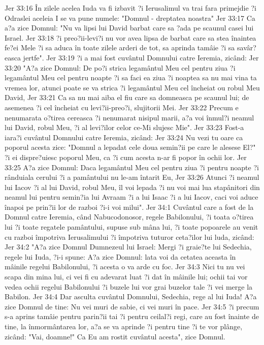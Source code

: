 Jer 33:16  În zilele acelea Iuda va fi izbavit ?i Ierusalimul va trai fara primejdie ?i Odraslei aceleia I se va pune numele: "Domnul - dreptatea noastra"
Jer 33:17  Ca a?a zice Domnul: "Nu va lipsi lui David barbat care sa ?ada pe scaunul casei lui Israel.
Jer 33:18  ?i preo?ii-levi?i nu vor avea lipsa de barbat care sa stea înaintea fe?ei Mele ?i sa aduca în toate zilele arderi de tot, sa aprinda tamâie ?i sa savâr?easca jertfe".
Jer 33:19  ?i a mai fost cuvântul Domnului catre Ieremia, zicând:
Jer 33:20  "A?a zice Domnul: De po?i strica legamântul Meu cel pentru ziua ?i legamântul Meu cel pentru noapte ?i sa faci ea ziua ?i noaptea sa nu mai vina ta vremea lor, atunci poate se va strica ?i legamântul Meu cel încheiat ou robul Meu David,
Jer 33:21  Ca sa nu mai aiba el fiu care sa domneasca pe scaunul lui; de asemenea ?i cel încheiat cu levi?ii-preo?i, slujitorii Mei.
Jer 33:22  Precum e nenumarata o?tirea cereasca ?i nenumarat nisipul marii, a?a voi înmul?i neamul lui David, robul Meu, ?i al levi?ilor celor ce-Mi slujesc Mie".
Jer 33:23  Fost-a iara?i cuvântul Domnului catre Ieremia, zicând:
Jer 33:24  Nu vezi tu oare ca poporul acesta zice: "Domnul a lepadat cele doua semin?ii pe care le alesese El?" ?i ei dispre?uiesc poporul Meu, ca ?i cum acesta n-ar fi popor în ochii lor.
Jer 33:25  A?a zice Domnul: Daca legamântul Meu cel pentru ziua ?i pentru noapte ?i rânduiala cerului ?i a pamântului nu le-am întarit Eu,
Jer 33:26  Atunci ?i neamul lui Iacov ?i al lui David, robul Meu, îl voi lepada ?i nu voi mai lua stapânitori din neamul lui pentru semin?ia lui Avraam ?i a lui Isaac ?i a lui Iacov, caci voi aduce înapoi pe prin?ii lor de razboi ?i-i voi milui".
Jer 34:1  Cuvântul care a fost de la Domnul catre Ieremia, când Nabucodonosor, regele Babilonului, ?i toata o?tirea lui ?i toate regatele pamântului, supuse sub mâna lui, ?i toate popoarele au venit cu razboi împotriva Ierusalimului ?i împotriva tuturor ceta?ilor lui luda, zicând:
Jer 34:2  "A?a zice Domnul Dumnezeul lui Israel: Mergi ?i graie?te lui Sedechia, regele lui Iuda, ?i-i spune: A?a zice Domnul: lata voi da cetatea aceasta în mâinile regelui Babilonului, ?i acesta o va arde cu foc.
Jer 34:3  Nici tu nu vei scapa din mina lui, ci vei fi cu adevarat luat ?i dat în mâinile lui; ochii tai vor vedea ochii regelui Babilonului ?i buzele lui vor grai buzelor tale ?i vei merge la Babilon.
Jer 34:4  Dar asculta cuvântul Domnului, Sedechia, rege al lui Iuda! A?a zice Domnul de tine: Nu vei muri de sabie, ci vei muri în pace.
Jer 34:5  ?i precum s-a aprins tamâie pentru parin?ii tai ?i pentru ceilal?i regi, care au fost înainte de tine, la înmormântarea lor, a?a se va aprinde ?i pentru tine ?i te vor plânge, zicând: "Vai, doamne!" Ca Eu am rostit cuvântul acesta", zice Domnul.
